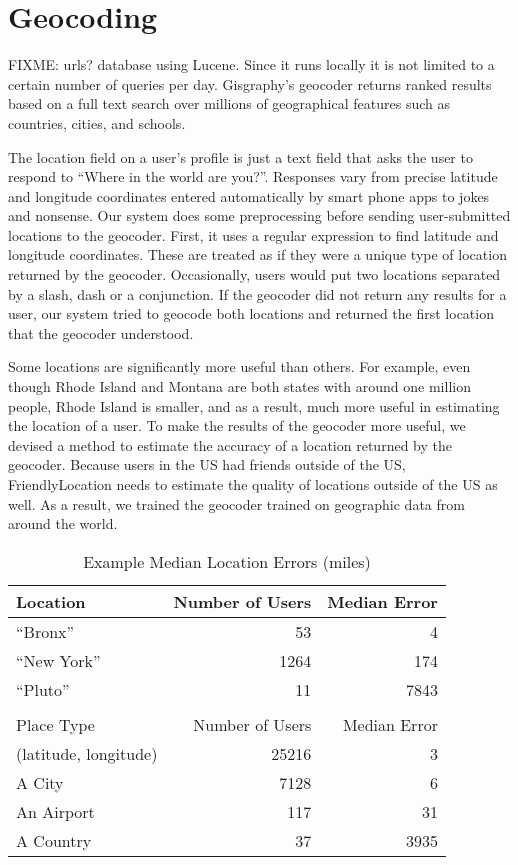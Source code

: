 \section{Geocoding}
FIXME: urls?
database using Lucene. Since
it runs locally it is not limited to a certain number of queries per day.
Gisgraphy's geocoder returns ranked results based on a full text search
over millions of geographical features such as countries, cities, and schools.

The location field on a user's profile is just a text field that asks the user
to respond to ``Where in the world are you?''.
Responses vary from precise latitude and longitude coordinates entered
automatically by smart phone apps to jokes and nonsense.
Our system does some preprocessing before sending user-submitted locations to
the geocoder.
First, it uses a regular expression to find latitude and longitude coordinates.
These are treated as if they were a unique type of location returned by the
geocoder.
Occasionally, users would put two locations separated by a slash, dash or a
conjunction.
If the geocoder did not return any results for a user, our system tried to
geocode both locations and returned the first location that the geocoder
understood.

Some locations are significantly more useful than others.
For example, even though Rhode Island and Montana are both states with around
one million people, Rhode Island is smaller, and as a result, much more useful
in estimating the location of a user.
To make the results of the geocoder more useful, we devised a method to
estimate the accuracy of a location returned by the geocoder.
Because users in the US had friends outside of the US, FriendlyLocation needs
to estimate the quality of
locations outside of the US as well.
As a result, we trained the geocoder trained on geographic data from around the
world.

\begin{table}[t]
\centering
\caption{Example Median Location Errors (miles)}
\begin{tabular}{l r r} 
Location&Number of Users&Median Error\\ \hline
``Bronx''&53&4\\
``New York''&1264&174\\
``Pluto''&11&7843\\ \hline
\\
Place Type&Number of Users&Median Error\\ \hline
(latitude, longitude)&25216&3\\
A City&7128&6\\
An Airport&117&31\\
A Country&37&3935\\
\hline\end{tabular}
\label{tab:MedianLocErr}
\end{table}

